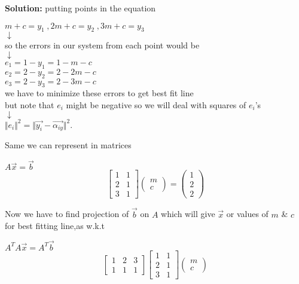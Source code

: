 \documentclass[a4paper,11pt]{article}
\numberwithin{equation}{section}
\begin{document}
\begin{itemize}
\textbf{Solution: } putting points in the equation
\begin{center}
    $m+c=y_1\hspace{3pt},2m+c=y_2\hspace{3pt},3m+c=y_3$\\
    $\downarrow$\\
    so the errors in our system from each point would be \\
    $\downarrow$\\
    $e_1=1-y_1=1-m-c$\\$e_2=2-y_2=2-2m-c$\\$e_3=2-y_3=2-3m-c$\\
    we have to minimize these errors to get best fit line\\
    but note that $e_i$ might be negative so we will deal with squares of $e_i$'s\\
    $\downarrow$\\
    $\Vert e_i\Vert^2=\Vert \vec{y_i}-\vec{\alpha_{iy}} \Vert^2$.
\end{center}
Same we can represent in matrices
\begin{center}
    $A\vec{x}=\vec{b}$
    \[
        \begin{bmatrix}
            1&1\\2&1\\3&1
        \end{bmatrix}
        \begin{pmatrix}
            m\\c
        \end{pmatrix}=
        \begin{pmatrix}
            1\\2\\2
        \end{pmatrix}
    \]
\end{center}
Now we have to find projection of $\vec{b}$ on $A$ which will give $\vec{x}$ or values of $m$ \& $c$ for best fitting line,as w.k.t
\begin{center}
    $A^TA\vec{x}=A^T\vec{b}$
    \[
    \begin{bmatrix}
        1&2&3\\1&1&1
    \end{bmatrix}
    \begin{bmatrix}
        1&1\\2&1\\3&1
    \end{bmatrix}
    \begin{pmatrix}
        m\\c

\end{pmatrix}\]
\end{center}
\end{itemize}
\end{document}
